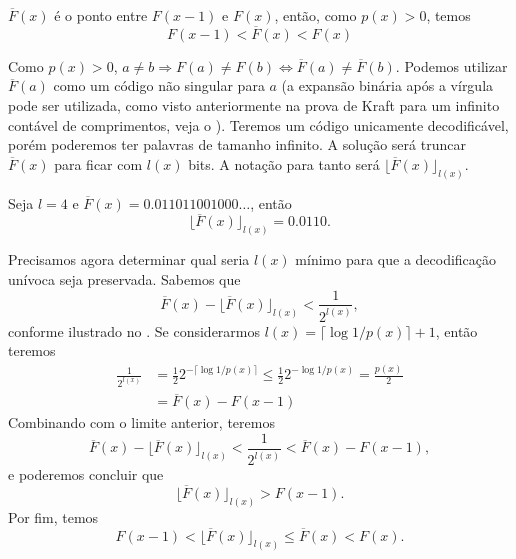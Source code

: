 $\overline{F}(x)$ é o ponto entre $F(x-1)$ e $F(x)$, então, como $p(x)>0$, temos
\begin{equation}
  F(x-1) < \overline{F}(x) < F(x)
\end{equation}

Como $p(x)>0$, $a \neq b \Rightarrow F(a) \neq F(b) \Leftrightarrow
\overline{F}(a) \neq \overline{F}(b)$. Podemos utilizar $\overline{F}(a)$ como
um código não singular para $a$ (a expansão binária após a vírgula pode ser utilizada,
como visto anteriormente na prova de Kraft para um infinito contável
de comprimentos, veja o ).  Teremos um código unicamente decodificável, porém poderemos
ter palavras de tamanho infinito.  A solução será truncar $\overline{F}(x)$
para ficar com $l(x)$ bits. A notação para tanto será $\lfloor \overline{F}(x) \rfloor_{l(x)}$.

\begin{example}\label{ex:Fbarratruncado}
Seja $l=4$ e $\overline{F}(x) = 0.011011001000\ldots$, então
\begin{equation}
    \lfloor \overline{F}(x) \rfloor_{l(x)} = 0.0110 .
\end{equation}
\end{example}

Precisamos agora determinar qual seria $l(x)$ mínimo para que a decodificação unívoca seja preservada.
Sabemos que
\begin{equation}
 \overline{F}(x) - \lfloor \overline{F}(x) \rfloor_{l(x)} < \frac{1}{2^{l(x)}} ,
\end{equation}
conforme ilustrado no .
Se considerarmos $l(x) = \lceil \log 1/p(x) \rceil + 1$, então teremos
\begin{subequations}
\begin{align}
\frac{1}{2^{l(x)}} &= \frac{1}{2} 2^{- \lceil \log 1/p(x) \rceil} \leq \frac{1}{2} 2^{-\log 1/p(x)} = \frac{p(x)}{2} \\
                &= \overline{F}(x) - F(x-1)
\end{align}
\end{subequations}
Combinando com o limite anterior, teremos
\begin{equation}
 \overline{F}(x) - \lfloor \overline{F}(x) \rfloor_{l(x)} < \frac{1}{2^{l(x)}} < \overline{F}(x) - F(x-1) ,
\end{equation}
e poderemos concluir que
\begin{equation}
 \lfloor \overline{F}(x) \rfloor_{l(x)} > F(x-1) .
\end{equation}
Por fim, temos
\begin{equation}
 F(x-1) < \lfloor \overline{F}(x) \rfloor_{l(x)} \leq \overline{F}(x) < F(x) .
\end{equation}

